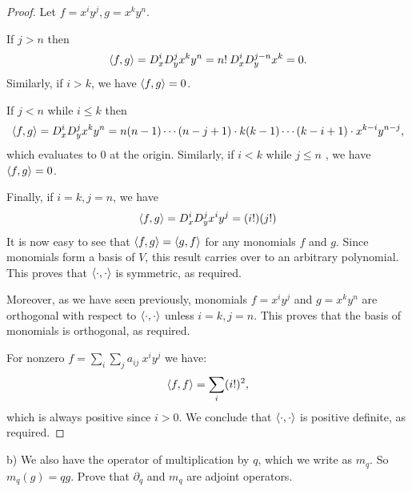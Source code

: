 \documentclass{article}
\theoremstyle{definition}
\DeclarePairedDelimiter\bilform{\langle}{\rangle}
\begin{document}
\begin{proof}

Let $f = x^i y^j, g = x^k y^n$.

If $j > n$ then
\[
	\bilform{f,g} 
	= D_x^i D_y^j x^k y^n 
	= n! \> D_x^i D_y^{j-n} x^k
	= 0.
\]
Similarly, if $i > k$, we have $\bilform{f,g} = 0$.

If $j < n$ while $i \leq k$ then
\[
	\bilform{f,g} 
	= D_x^i D_y^j x^k y^n 
	= n (n-1) \cdots (n-j+1) \cdot k (k-1) \cdots (k-i+1) \cdot x^{k-i} y^{n-j},
\]
which evaluates to $0$ at the origin.
Similarly, if $i < k$ while $j \leq n$ , we have $\bilform{f,g} = 0$.

Finally, if $i = k, j = n$, we have
\[
	\bilform{f,g}
	= D_x^i D_y^j x^i y^j
	= (i!) (j!)
\]
It is now easy to see that $\bilform{f,g} = \bilform{g,f}$ for any monomials $f$ and $g$.
Since monomials form a basis of $V$, this result carries over to an arbitrary polynomial.
This proves that $\bilform{\cdot,\cdot}$ is symmetric, as required.

Moreover, as we have seen previously, monomials $f = x^i y^j$ and $g = x^k y^n$ are orthogonal with respect to $\bilform{\cdot,\cdot}$ unless $i = k, j = n$.
This proves that the basis of monomials is orthogonal, as required.

For nonzero $f = \sum_i \sum_j a_{ij} \> x^i y^j$ we have:
\[
	\bilform{f,f}
	= \sum_i (i!)^2,
\]
which is always positive since $i > 0$.
We conclude that $\bilform{\cdot,\cdot}$ is positive definite, as required.

\end{proof}


\begin{tcolorbox}
b) We also have the operator of multiplication by $q$, which we write as $m_q$.
So $m_q(g) = qg$.
Prove that $\partial_q$ and $m_q$ are adjoint operators.
\end{tcolorbox}
\end{document}
